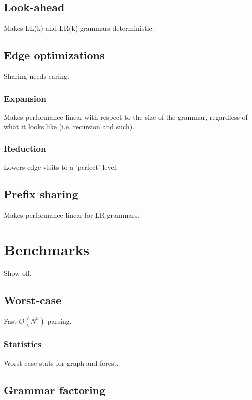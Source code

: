 \documentclass[a4paper,10pt]{article}
\begin{document}
\subsection{Look-ahead}

Makes LL(k) and LR(k) grammars deterministic.

\subsection{Edge optimizations}

Sharing needs caring.

\subsubsection{Expansion}

Makes performance linear with respect to the size of the grammar, regardless of what it looks like (i.e. recursion and such).

\subsubsection{Reduction}

Lowers edge visits to a 'perfect' level.

\subsection{Prefix sharing}

Makes performance linear for LR grammars.

\section{Benchmarks}

Show off.

\subsection{Worst-case}

Fast $O(N^3)$ parsing.

\subsubsection{Statistics}

Worst-case stats for graph and forest.

\subsection{Grammar factoring}
\end{document}
